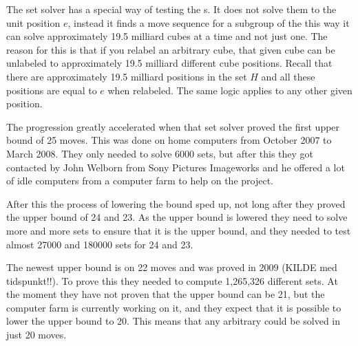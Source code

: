 The set solver has a special way of testing the \rubik{}s. It does not solve them to the unit position $e$, instead it finds a move sequence for a subgroup of the \rubik{} this way it can solve approximately 19.5 milliard cubes at a time and not just one. The reason for this is that if you relabel an arbitrary cube, that given cube can be unlabeled to approximately 19.5 milliard different cube positions. Recall that there are approximately 19.5 milliard positions in the set $H$ and all these positions are equal to $e$ when relabeled. The same logic applies to any other given position.

The progression greatly accelerated when that set solver proved the first upper bound of 25 moves. This was done on home computers from October 2007 to March 2008. They only needed to solve 6000 sets, but after this they got contacted by John Welborn from Sony Pictures Imageworks and he offered a lot of idle computers from a computer farm to help on the project. 

After this the process of lowering the bound sped up, not long after they proved the upper bound of 24 and 23. As the upper bound is lowered they need to solve more and more sets to ensure that it is the upper bound, and they needed to test almost 27000 and 180000 sets for 24 and 23. 

The newest upper bound is on 22 moves and was proved in 2009 (KILDE med tidspunkt!!). To prove this they needed to compute 1,265,326 different sets. At the moment they have not proven that the upper bound can be 21, but the computer farm is currently working on it, and they expect that it is possible to lower the upper bound to 20. This means that any arbitrary \rubik{} could be solved in just 20 moves.
 
